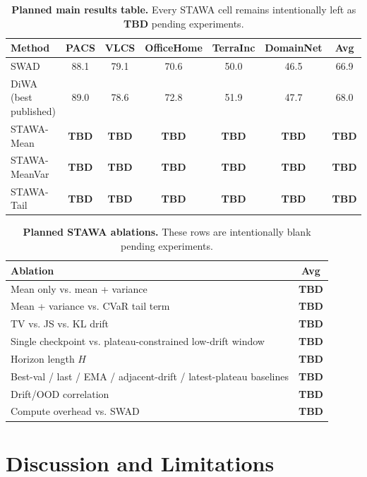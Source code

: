 \documentclass{article}
\newcommand{\TBD}{\textbf{TBD}}
\newcommand{\ood}{OOD}
\newcommand{\stawa}{\textup{\textsc{STAWA}}}
\newcommand{\swad}{\textup{\textsc{SWAD}}}
\begin{document}
\begin{table}[t]
    \centering
    \small
    \caption{\textbf{Planned main results table.} Every \stawa{} cell remains intentionally left as \TBD{} pending experiments.}
    \label{tab:main_tbd}
    \begin{tabular}{lcccccc}
        \toprule
        Method & PACS & VLCS & OfficeHome & TerraInc & DomainNet & Avg \\
        \midrule
        \swad{} & 88.1 & 79.1 & 70.6 & 50.0 & 46.5 & 66.9 \\
        DiWA (best published) & 89.0 & 78.6 & 72.8 & 51.9 & 47.7 & 68.0 \\
        \stawa-Mean & \TBD & \TBD & \TBD & \TBD & \TBD & \TBD \\
        \stawa-MeanVar & \TBD & \TBD & \TBD & \TBD & \TBD & \TBD \\
        \stawa-Tail & \TBD & \TBD & \TBD & \TBD & \TBD & \TBD \\
        \bottomrule
    \end{tabular}
\end{table}

\begin{table}[t]
    \centering
    \small
    \caption{\textbf{Planned \stawa{} ablations.} These rows are intentionally blank pending experiments.}
    \label{tab:ablations}
    \begin{tabular}{lc}
        \toprule
        Ablation & Avg \\
        \midrule
        Mean only vs. mean + variance & \TBD \\
        Mean + variance vs. CVaR tail term & \TBD \\
        TV vs. JS vs. KL drift & \TBD \\
        Single checkpoint vs. plateau-constrained low-drift window & \TBD \\
        Horizon length $H$ & \TBD \\
        Best-val / last / EMA / adjacent-drift / latest-plateau baselines & \TBD \\
        Drift/\ood{} correlation & \TBD \\
        Compute overhead vs. \swad{} & \TBD \\
        \bottomrule
    \end{tabular}
\end{table}

\section{Discussion and Limitations}
\end{document}
